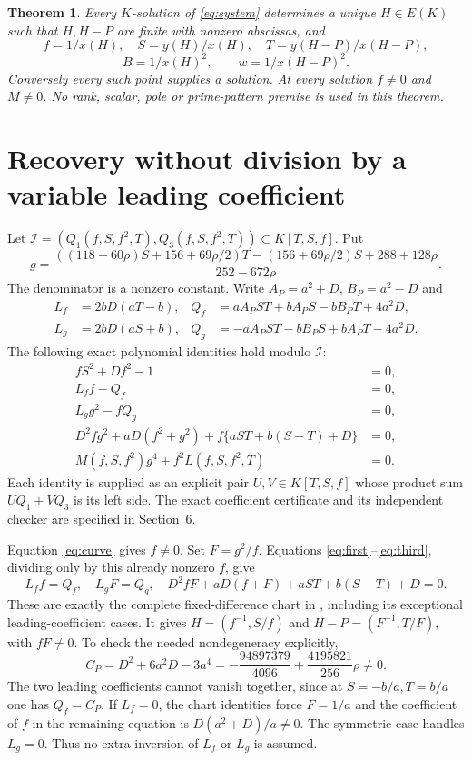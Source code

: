 \documentclass[11pt,a4paper]{article}
\newtheorem{theorem}{Theorem}[section]\newtheorem{lemma}[theorem]{Lemma}
\begin{document}
\begin{theorem}\label{thm:chart}
Every $K$-solution of \eqref{eq:system} determines a unique
$H\in E(K)$ such that $H,H-P$ are finite with nonzero abscissas, and
\[
 f=1/x(H),\quad S=y(H)/x(H),\quad T=y(H-P)/x(H-P),
\]
\[
 B=1/x(H)^2,\qquad w=1/x(H-P)^2.
\]
Conversely every such point supplies a solution. At every solution
$f\ne0$ and $M\ne0$. No rank, scalar, pole or prime-pattern premise
is used in this theorem.
\end{theorem}

\section{Recovery without division by a variable leading coefficient}
Let $\mathcal I=(Q_1(f,S,f^2,T),Q_3(f,S,f^2,T))\subset K[T,S,f]$.
Put
\[
 g=\frac{((118+60\rho)S+156+69\rho/2)T-(156+69\rho/2)S+288+128\rho}
              {252-672\rho}.
\]
The denominator is a nonzero constant. Write $A_P=a^2+D$, $B_P=a^2-D$
and
\begin{align*}
 L_f&=2bD(aT-b),&Q_f&=aA_PST+bA_PS-bB_PT+4a^2D,\\
 L_g&=2bD(aS+b),&Q_g&=-aA_PST-bB_PS+bA_PT-4a^2D.
\end{align*}
The following exact polynomial identities hold modulo $\mathcal I$:
\begin{align}
 fS^2+Df^2-1&=0,\label{eq:curve}\\
 L_ff-Q_f&=0,\label{eq:first}\\
 L_gg^2-fQ_g&=0,\label{eq:second}\\
 D^2fg^2+aD(f^2+g^2)+f\{aST+b(S-T)+D\}&=0,\label{eq:third}\\
 M(f,S,f^2)g^4+f^2L(f,S,f^2,T)&=0.\label{eq:weight}
\end{align}
Each identity is supplied as an explicit pair $U,V\in K[T,S,f]$
whose product sum $UQ_1+VQ_3$ is its left side. The exact coefficient
certificate and its independent checker are specified in Section~6.

Equation \eqref{eq:curve} gives $f\ne0$. Set $F=g^2/f$.
Equations \eqref{eq:first}--\eqref{eq:third}, dividing only by this
already nonzero $f$, give
\[
 L_ff=Q_f,\quad L_gF=Q_g,\quad
 D^2fF+aD(f+F)+aST+b(S-T)+D=0.
\]
These are exactly the complete fixed-difference chart in \cite{Fixed},
including its exceptional leading-coefficient cases. It gives
$H=(f^{-1},S/f)$ and $H-P=(F^{-1},T/F)$, with $fF\ne0$.
To check the needed nondegeneracy explicitly,
\[
 C_P=D^2+6a^2D-3a^4=-\frac{94897379}{4096}+\frac{4195821}{256}\rho\ne0.
\]
The two leading coefficients cannot vanish together, since at
$S=-b/a,T=b/a$ one has $Q_f=C_P$. If $L_f=0$, the chart identities
force $F=1/a$ and the coefficient of $f$ in the remaining equation is
$D(a^2+D)/a\ne0$. The symmetric case handles $L_g=0$.
Thus no extra inversion of $L_f$ or $L_g$ is assumed.
\end{document}
